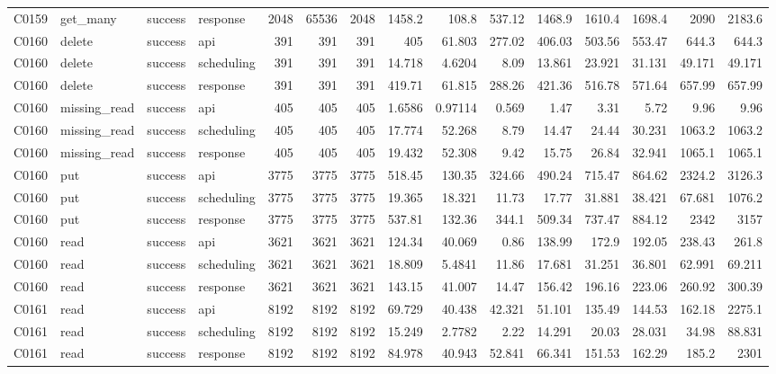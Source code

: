 \begin{landscape}
\begin{longtable}{llllrrrrrrrrrrr}
C0159 & get\_\allowbreak{}many & success & response & 2048 & 65536 & 2048 & 1458.2 & 108.8 & 537.12 & 1468.9 & 1610.4 & 1698.4 & 2090 & 2183.6\\
C0160 & delete & success & api & 391 & 391 & 391 & 405 & 61.803 & 277.02 & 406.03 & 503.56 & 553.47 & 644.3 & 644.3\\
C0160 & delete & success & scheduling & 391 & 391 & 391 & 14.718 & 4.6204 & 8.09 & 13.861 & 23.921 & 31.131 & 49.171 & 49.171\\
C0160 & delete & success & response & 391 & 391 & 391 & 419.71 & 61.815 & 288.26 & 421.36 & 516.78 & 571.64 & 657.99 & 657.99\\
C0160 & missing\_\allowbreak{}read & success & api & 405 & 405 & 405 & 1.6586 & 0.97114 & 0.569 & 1.47 & 3.31 & 5.72 & 9.96 & 9.96\\
C0160 & missing\_\allowbreak{}read & success & scheduling & 405 & 405 & 405 & 17.774 & 52.268 & 8.79 & 14.47 & 24.44 & 30.231 & 1063.2 & 1063.2\\
C0160 & missing\_\allowbreak{}read & success & response & 405 & 405 & 405 & 19.432 & 52.308 & 9.42 & 15.75 & 26.84 & 32.941 & 1065.1 & 1065.1\\
C0160 & put & success & api & 3775 & 3775 & 3775 & 518.45 & 130.35 & 324.66 & 490.24 & 715.47 & 864.62 & 2324.2 & 3126.3\\
C0160 & put & success & scheduling & 3775 & 3775 & 3775 & 19.365 & 18.321 & 11.73 & 17.77 & 31.881 & 38.421 & 67.681 & 1076.2\\
C0160 & put & success & response & 3775 & 3775 & 3775 & 537.81 & 132.36 & 344.1 & 509.34 & 737.47 & 884.12 & 2342 & 3157\\
C0160 & read & success & api & 3621 & 3621 & 3621 & 124.34 & 40.069 & 0.86 & 138.99 & 172.9 & 192.05 & 238.43 & 261.8\\
C0160 & read & success & scheduling & 3621 & 3621 & 3621 & 18.809 & 5.4841 & 11.86 & 17.681 & 31.251 & 36.801 & 62.991 & 69.211\\
C0160 & read & success & response & 3621 & 3621 & 3621 & 143.15 & 41.007 & 14.47 & 156.42 & 196.16 & 223.06 & 260.92 & 300.39\\
C0161 & read & success & api & 8192 & 8192 & 8192 & 69.729 & 40.438 & 42.321 & 51.101 & 135.49 & 144.53 & 162.18 & 2275.1\\
C0161 & read & success & scheduling & 8192 & 8192 & 8192 & 15.249 & 2.7782 & 2.22 & 14.291 & 20.03 & 28.031 & 34.98 & 88.831\\
C0161 & read & success & response & 8192 & 8192 & 8192 & 84.978 & 40.943 & 52.841 & 66.341 & 151.53 & 162.29 & 185.2 & 2301\\

\end{longtable}
\end{landscape}
